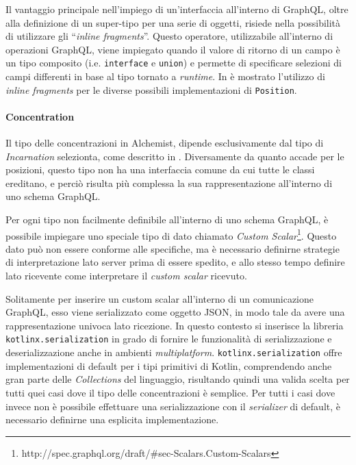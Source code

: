 Il vantaggio principale nell'impiego di un'interfaccia all'interno di GraphQL, oltre alla definizione di un super-tipo per una serie di oggetti,
risiede nella possibilità di utilizzare gli ``\textit{inline fragments}''. Questo operatore, utilizzabile all'interno di operazioni GraphQL, viene impiegato
quando il valore di ritorno di un campo è un tipo composito (i.e. \texttt{interface} e \texttt{union}) e permette di specificare selezioni di campi differenti
in base al tipo tornato a \textit{runtime}. In  è mostrato l'utilizzo di \textit{inline fragments} per le diverse possibili implementazioni
di \texttt{Position}.


\paragraph{Concentration}
Il tipo delle concentrazioni in Alchemist, dipende esclusivamente dal tipo di \textit{Incarnation} selezionta, come descritto in .
Diversamente da quanto accade per le posizioni, questo tipo non ha una interfaccia comune da cui tutte le classi ereditano, e perciò risulta più complessa
la sua rappresentazione all'interno di uno schema GraphQL.

Per ogni tipo non facilmente definibile all'interno di uno schema GraphQL, è possibile impiegare uno speciale tipo di dato chiamato
\textit{Custom Scalar}\footnote{http://spec.graphql.org/draft/\#sec-Scalars.Custom-Scalars}. Questo dato può non essere conforme alle specifiche, ma è
necessario definirne strategie di interpretazione lato server prima di essere spedito, e allo stesso tempo definire lato ricevente come interpretare
il \textit{custom scalar} ricevuto.

Solitamente per inserire un custom scalar all'interno di un comunicazione GraphQL, esso viene serializzato come oggetto JSON, in modo tale da avere
una rappresentazione univoca lato ricezione. In questo contesto si inserisce la libreria \texttt{kotlinx.serialization} in grado di fornire le funzionalità
di serializzazione e deserializzazione anche in ambienti \textit{multiplatform}. \texttt{kotlinx.serialization} offre implementazioni di default per
i tipi primitivi di Kotlin, comprendendo anche gran parte delle \textit{Collections} del linguaggio, risultando quindi una valida scelta per tutti quei
casi dove il tipo delle concentrazioni è semplice. Per tutti i casi dove invece non è possibile effettuare una serializzazione con il \textit{serializer}
di default, è necessario definirne una esplicita implementazione.

